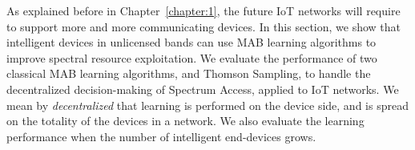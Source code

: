 
\graphicspath{{2-Chapters/4-Chapter/CrownCom_17.git/}}

As explained before in Chapter~\ref{chapter:1}, the future IoT networks will require to support more and more communicating devices.
In this section, we show that intelligent devices in unlicensed bands can use MAB learning algorithms to improve spectral resource exploitation.
%
We evaluate the performance of two classical MAB learning algorithms, \UCB{} and Thomson Sampling, to handle the decentralized decision-making of Spectrum Access, applied to IoT networks.
We mean by \emph{decentralized} that learning is performed on the device side, and is spread on the totality of the devices in a network.
We also evaluate the learning performance when the number of intelligent end-devices grows.
%



